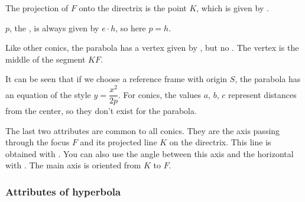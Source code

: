 The projection of $F$ onto the directrix is the point $K$, which is given by .

$p$, the , is always given by $e \cdot h$, so here $p = h$.

Like other conics, the parabola has a vertex given by , but no . The vertex is the middle of the segment $KF$.

It can be seen that if we choose a reference frame with origin $S$, the parabola has an equation of the style $y = \dfrac{x^2}{2p}$. For conics, the values $a$, $b$, $c$ represent distances from the center, so they don't exist for the parabola.

The last two attributes are common to all conics. They are the axis passing through the focus $F$ and its projected line $K$ on the directrix. This line is obtained with . You can also use the angle between this axis and the horizontal with . The main axis is oriented from $K$ to $F$.
 

 

\subsubsection{Attributes of hyperbola} %
\label{ssub:attributes_of_hyperbola}

